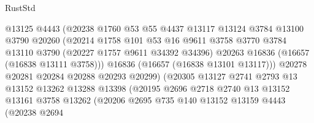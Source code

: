 \begin{lexlean}{RustStd}
\begin{coremodule}
                                @13125
                                @4443
                                (@20238
                                  @1760
                                  @53
                                  @55
                                  @4437
                                  @13117
                                  @13124
                                  @3784
                                  @13100
                                  @3790
                                  @20260
                                  (@20214
                                    @1758
                                    @101
                                    @53
                                    @16
                                    @9611
                                    @3758
                                    @3770
                                    @3784
                                    @13110
                                    @3790
                                    (@20227 @1757 @9611 @34392 @34396)
                                    @20263
                                    @16836
                                    (@16657 (@16838 @13111 @3758)))
                                  @16836
                                  (@16657 (@16838 @13101 @13117)))
                                @20278
                                @20281
                                @20284
                                @20288
                                @20293
                                @20299)
                              (@20305
                                @13127
                                @2741
                                @2793
                                @13
                                @13152
                                @13262
                                @13288
                                @13398
                                (@20195
                                  @2696
                                  @2718
                                  @2740
                                  @13
                                  @13152
                                  @13161
                                  @3758
                                  @13262
                                  (@20206
                                    @2695
                                    @735
                                    @140
                                    @13152
                                    @13159
                                    @4443
                                    (@20238
                                      @2694

\end{coremodule}
\end{lexlean}
